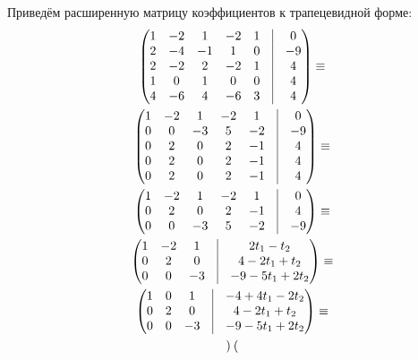 \documentclass[12pt, a4paper]{article}
\begin{document}
    Приведём расширенную матрицу коэффициентов к трапецевидной форме:
    \begin{multline} 
        \begin{pmatrix}
            1 & -2 & 1  & -2 & 1 & \vrule & 0  \\
            2 & -4 & -1 & 1  & 0 & \vrule & -9 \\
            2 & -2 & 2  & -2 & 1 & \vrule & 4 \\
            1 & 0  & 1  & 0  & 0 & \vrule & 4 \\
            4 & -6 & 4  & -6 & 3 & \vrule & 4 \\
        \end{pmatrix} \equiv \\ \begin{pmatrix}
            1 & -2 & 1 & -2 & 1 & \vrule & 0  \\
            0 & 0 & -3 & 5  & -2 & \vrule & -9 \\
            0 & 2 & 0  & 2 & -1 & \vrule & 4 \\
            0 & 2  & 0 & 2  & -1 & \vrule & 4 \\
            0 & 2 & 0  & 2 & -1 & \vrule & 4 \\
        \end{pmatrix} \equiv \\ \begin{pmatrix}
            1 & -2 & 1 & -2 & 1 & \vrule & 0  \\
            0 & 2 & 0  & 2 & -1 & \vrule & 4 \\
            0 & 0 & -3 & 5  & -2 & \vrule & -9 \\
        \end{pmatrix} \equiv \\ \begin{pmatrix}
            1 & -2 & 1 & \vrule & 2t_1 - t_2  \\
            0 & 2 & 0  & \vrule & 4 - 2t_1 + t_2 \\
            0 & 0 & -3 & \vrule & -9 - 5t_1 + 2t_2 \\
        \end{pmatrix} \equiv \\ \begin{pmatrix}
            1 & 0 & 1 & \vrule & - 4 + 4 t_1 - 2 t_2 \\
            0 & 2 & 0  & \vrule & 4 - 2t_1 + t_2 \\
            0 & 0 & -3 & \vrule & -9 - 5t_1 + 2t_2 \\
        \end{pmatrix} \equiv \\ \begin{pmatrix}

\end{pmatrix}
\end{multline}
\end{document}
